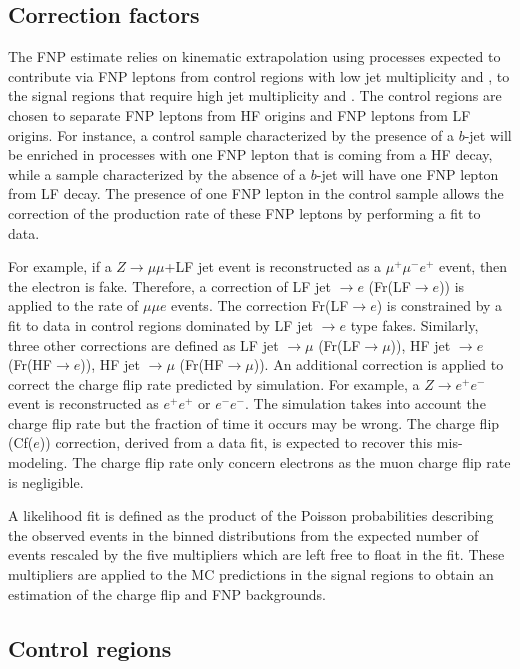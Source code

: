 \subsection{Correction factors}

The FNP estimate relies on kinematic extrapolation using processes expected to contribute via FNP leptons from control regions 
with low jet multiplicity and \met, to the signal regions that require high jet multiplicity and \met. 
The control regions are chosen to separate FNP leptons from HF origins and FNP leptons from LF origins.
For instance, a control sample characterized by the presence of a $b$-jet will be enriched in processes with one FNP lepton that is 
coming from a HF decay, while a sample characterized by the absence of a $b$-jet will have one FNP lepton from LF decay.
The presence of one FNP lepton in the control sample allows the correction of the production rate of these FNP leptons 
by performing a fit to data. 

For example, if a $Z\to\mu\mu$+LF jet event is reconstructed as a $\mu^+\mu^-e^+$ event, then the electron is fake.
Therefore, a correction of LF jet $\to e$ (Fr(LF$\to e$)) is applied to the rate of $\mu\mu e$ events. The correction Fr(LF$\to e$)
is constrained by a fit to data in control regions dominated by LF jet $\to e$ type fakes. 
Similarly, three other corrections are defined as LF jet $\to \mu$ (Fr(LF$\to\mu$)),  HF jet $\to e$ (Fr(HF$\to e$)),  
HF jet $\to\mu$ (Fr(HF$\to\mu$)). An additional correction is applied to correct the charge flip rate predicted by simulation.
For example, a $Z\to e^+e^-$ event is reconstructed as $e^+e^+$ or $e^-e^-$. The simulation takes into account the charge flip 
rate but the fraction of time it occurs may be wrong. The charge flip (Cf($e$)) correction, derived from a data fit, is expected to recover this mis-modeling.
The charge flip rate only concern electrons as the muon charge flip rate is negligible.

A likelihood fit is defined as the product of the Poisson probabilities describing the observed events in the binned 
distributions from the expected number of events rescaled by the five multipliers which are left free to float in the fit.  
These multipliers are applied to the MC predictions in the signal regions to obtain an estimation of the charge flip and FNP backgrounds.

\subsection{Control regions}

